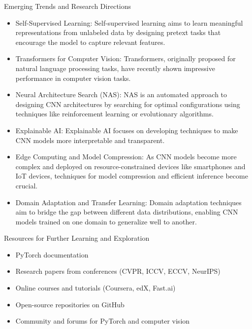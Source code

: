 \documentclass{beamer}
\begin{document}
\begin{frame}{Emerging Trends and Research Directions}
\begin{itemize}
    \item Self-Supervised Learning: Self-supervised learning aims to learn meaningful representations from unlabeled data by designing pretext tasks that encourage the model to capture relevant features. 
    \item Transformers for Computer Vision: Transformers, originally proposed for natural language processing tasks, have recently shown impressive performance in computer vision tasks. 
    \item Neural Architecture Search (NAS): NAS is an automated approach to designing CNN architectures by searching for optimal configurations using techniques like reinforcement learning or evolutionary algorithms.
    \item Explainable AI: Explainable AI focuses on developing techniques to make CNN models more interpretable and transparent.
    \item Edge Computing and Model Compression: As CNN models become more complex and deployed on resource-constrained devices like smartphones and IoT devices, techniques for model compression and efficient inference become crucial.
    \item Domain Adaptation and Transfer Learning: Domain adaptation techniques aim to bridge the gap between different data distributions, enabling CNN models trained on one domain to generalize well to another. 
\end{itemize}
\end{frame}

\begin{frame}{Resources for Further Learning and Exploration}
\begin{itemize}
    \item PyTorch documentation
    \item Research papers from conferences (CVPR, ICCV, ECCV, NeurIPS)
    \item Online courses and tutorials (Coursera, edX, Fast.ai)
    \item Open-source repositories on GitHub
    \item Community and forums for PyTorch and computer vision
\end{itemize}
\end{frame}
\end{document}
